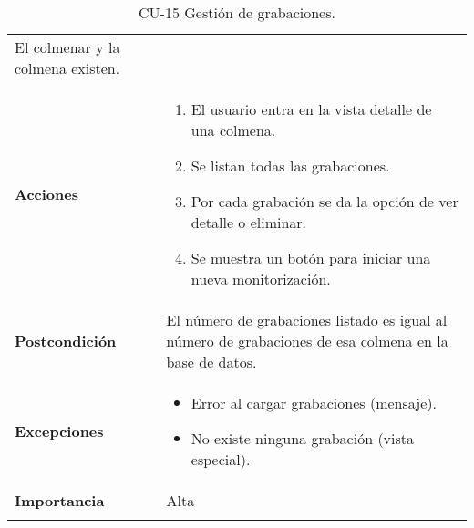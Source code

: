 \begin{longtable}[H]{@{}ll@{}}
\begin{minipage}[t]{0.74\columnwidth}
El colmenar y la colmena existen.\strut
\end{minipage}\tabularnewline
\begin{minipage}[t]{0.20\columnwidth}\raggedright\strut
\textbf{Acciones}\strut
\end{minipage} & \begin{minipage}[t]{0.74\columnwidth}\raggedright\strut
\begin{enumerate}
\def\labelenumi{\arabic{enumi}.}
\tightlist
\item
  El usuario entra en la vista detalle de una colmena.
\item
  Se listan todas las grabaciones.
\item
  Por cada grabación se da la opción de ver detalle o eliminar.
\item
  Se muestra un botón para iniciar una nueva monitorización.
\end{enumerate}\strut
\end{minipage}\tabularnewline
\begin{minipage}[t]{0.20\columnwidth}\raggedright\strut
\textbf{Postcondición}\strut
\end{minipage} & \begin{minipage}[t]{0.74\columnwidth}\raggedright\strut
El número de grabaciones listado es igual al número de grabaciones de
esa colmena en la base de datos.\strut
\end{minipage}\tabularnewline
\begin{minipage}[t]{0.20\columnwidth}\raggedright\strut
\textbf{Excepciones}\strut
\end{minipage} & \begin{minipage}[t]{0.74\columnwidth}\raggedright\strut
\begin{itemize}
\tightlist
\item
  Error al cargar grabaciones (mensaje).
\item
  No existe ninguna grabación (vista especial).
\end{itemize}\strut
\end{minipage}\tabularnewline
\begin{minipage}[t]{0.20\columnwidth}\raggedright\strut
\textbf{Importancia}\strut
\end{minipage} & \begin{minipage}[t]{0.74\columnwidth}\raggedright\strut
Alta\strut
\end{minipage}\tabularnewline
\bottomrule
\caption{CU-15 Gestión de grabaciones.}
\end{longtable}

